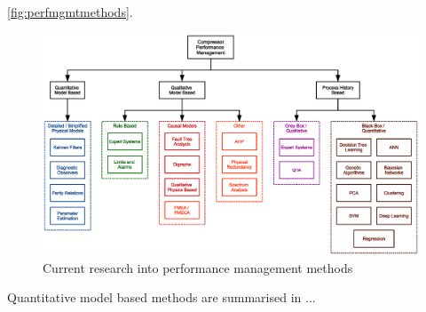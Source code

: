\autoref{fig:perfmgmtmethods}.

\begin{figure}
\includegraphics[width=\textwidth]{./Images/perfmgmt.eps}
\caption{Current research into performance management methods}
\label{fig:perfmgmtmethods}
\end{figure}

Quantitative model based methods are summarised in ...

